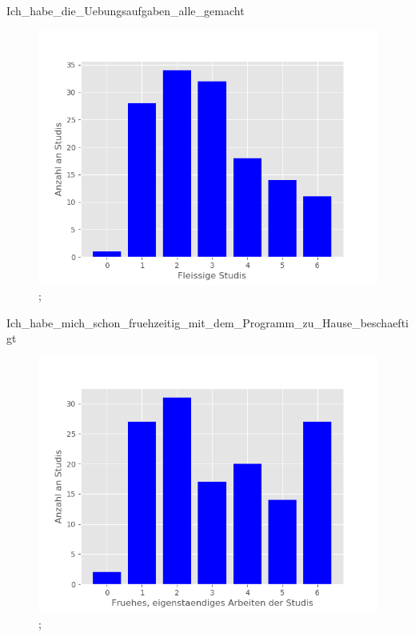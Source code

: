 \documentclass[10pt]{beamer}
\begin{document}
\begin{frame}[fragile]{Ich_habe_die_Uebungsaufgaben_alle_gemacht} 
 \begin{figure}
 \includegraphics[width= 0.9\linewidth]{./PDFcreater/Plots/Ich_habe_die_Uebungsaufgaben_alle_gemacht.png};
 \end{figure}
 \end{frame}
\begin{frame}[fragile]{Ich_habe_mich_schon_fruehzeitig_mit_dem_Programm_zu_Hause_beschaeftigt} 
 \begin{figure}
 \includegraphics[width= 0.9\linewidth]{./PDFcreater/Plots/Ich_habe_mich_schon_fruehzeitig_mit_dem_Programm_zu_Hause_beschaeftigt.png};
 \end{figure}
 \end{frame}
\end{document}
